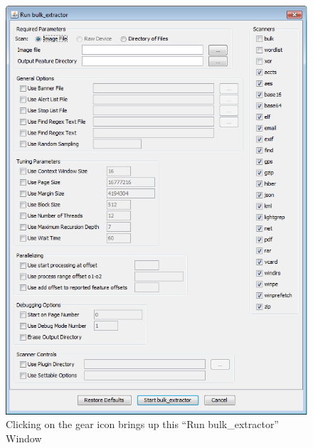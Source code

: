 \documentclass[11pt]{article} %
\begin{document}
\begin{figure}
	\center
	\includegraphics{viewerPics/runBulk.png}
	\caption{Clicking on the gear icon brings up this ``Run bulk\_extractor'' Window}
	\label{fig:runBulk}
\end{figure}
\end{document}

